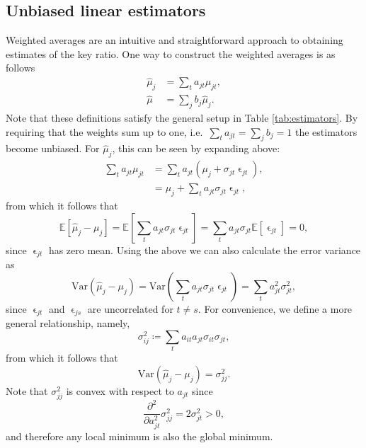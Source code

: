 \documentclass[11pt]{article}
\theoremstyle{definition}
\begin{document}
\subsection{Unbiased linear estimators}
Weighted averages are an intuitive and straightforward approach to obtaining estimates of the key ratio. One way to construct the weighted averages is as follows
\begin{equation} \label{eq:linear_model}
    \begin{aligned}
        \hat\mu_j &= \sum_t a_{jt}\mu_{jt},\\
        \hat\mu &= \sum_j b_j \hat\mu_j. 
    \end{aligned}
\end{equation}
Note that these definitions satisfy the general setup in Table \ref{tab:estimators}. By requiring that the weights sum up to one, i.e.\ $\sum_t a_{jt}=\sum_j b_j=1$ the estimators become unbiased. For $\hat\mu_j$, this can be seen by expanding above:
\begin{equation*}
    \begin{aligned}
    \sum_t a_{jt}\mu_{jt} &= \sum_t a_{jt}(\mu_j + \sigma_{jt}\upvarepsilon_{jt}), \\
    &= \mu_j + \sum_t a_{jt}\sigma_{jt}\upvarepsilon_{jt},
    \end{aligned}
\end{equation*}
from which it follows that
\begin{equation*}
    \mathds{E}[\hat\mu_j  - \mu_j] = \mathds{E}[\sum_t a_{jt}\sigma_{jt}\upvarepsilon_{jt}] = \sum_t a_{jt}\sigma_{jt}\mathds{E}[\upvarepsilon_{jt}] =  0,
\end{equation*}
since $\upvarepsilon_{jt}$ has zero mean. Using the above we can also calculate the error variance as
\begin{equation*}
    \text{Var}(\hat\mu_j - \mu_j) = \text{Var}(\sum_t a_{jt}\sigma_{jt}\upvarepsilon_{jt}) = \sum_t a_{jt}^2\sigma_{jt}^2,
\end{equation*}
since $\upvarepsilon_{jt}$ and $\upvarepsilon_{js}$ are uncorrelated for $t\neq s$. For convenience, we define a more general relationship, namely,
\begin{equation}\label{eq:sigma_ij}
    \sigma_{ij}^2 \coloneqq \sum_t a_{it}a_{jt}\sigma_{it}\sigma_{jt},
\end{equation}
from which it follows that 
\begin{equation}\label{eq:sigma_j}
    \text{Var}(\hat\mu_j - \mu_j)=\sigma_{jj}^2.
\end{equation}
Note that $\sigma_{jj}^2$ is convex with respect to $a_{jt}$ since
\begin{equation*}
    \frac{\partial^2}{\partial a_{jt}^2}\sigma_{jj}^2 = 2\sigma_{jt}^2 > 0,
\end{equation*}
and therefore any local minimum is also the global minimum.
\end{document}
